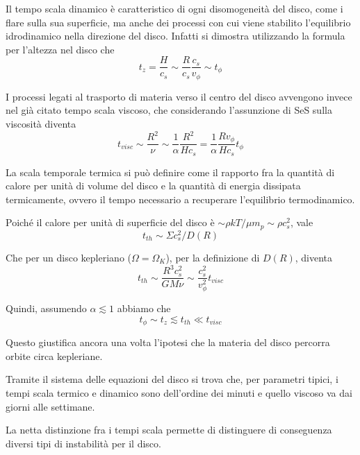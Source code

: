 \documentclass[a4paperbi]{article}
\begin{document}
	Il tempo scala dinamico è caratteristico di ogni disomogeneità del disco, come i flare sulla sua superficie, ma anche dei processi con cui viene stabilito l'equilibrio idrodinamico nella direzione del disco. Infatti si dimostra utilizzando la formula per l'altezza nel disco che
	\begin{equation}
		t_z=\frac{H}{c_s}\sim \frac{R}{c_s}\frac{c_s}{v_\phi}\sim t_\phi
	\end{equation}
	
	I processi legati al trasporto di materia verso il centro del disco avvengono invece nel già citato tempo scala viscoso, che considerando l'assunzione di SeS sulla viscosità diventa
	\begin{equation}
		t_{visc}\sim\frac{R^2}{\nu}\sim\frac{1}{\alpha}\frac{R^2}{Hc_s}=\frac{1}{\alpha}\frac{Rv_\phi}{Hc_s}t_\phi
	\end{equation}

	La scala temporale termica si può definire come il rapporto fra la quantità di calore per unità di volume del disco e la quantità di energia dissipata termicamente, ovvero il tempo necessario a recuperare l'equilibrio termodinamico.
	
	Poiché il calore per unità di superficie del disco è $\sim\rho kT/\mu m_p\sim\rho c_s^2$, vale
	\begin{equation*}
		t_{th}\sim\Sigma c_s^2/D(R)
	\end{equation*}
	
	Che per un disco kepleriano ($\Omega=\Omega_K$), per la definizione di $D(R)$, diventa
	\begin{equation}
		t_{th}\sim\frac{R^3c_s^2}{GM\nu}\sim\frac{c_s^2}{v_\phi^2}t_{visc}
	\end{equation}
	
	Quindi, assumendo $\alpha\lesssim1$ abbiamo che
	\begin{equation}
		t_\phi\sim t_z\lesssim t_{th}\ll t_{visc}	
	\end{equation}

	Questo giustifica ancora una volta l'ipotesi che la materia del disco percorra orbite circa kepleriane.

	Tramite il sistema delle equazioni del disco si trova che, per parametri tipici, i tempi scala termico e dinamico sono dell'ordine dei minuti e quello viscoso va dai giorni alle settimane.
	
	La netta distinzione fra i tempi scala permette di distinguere di conseguenza diversi tipi di instabilità per il disco.
	
\end{document}
